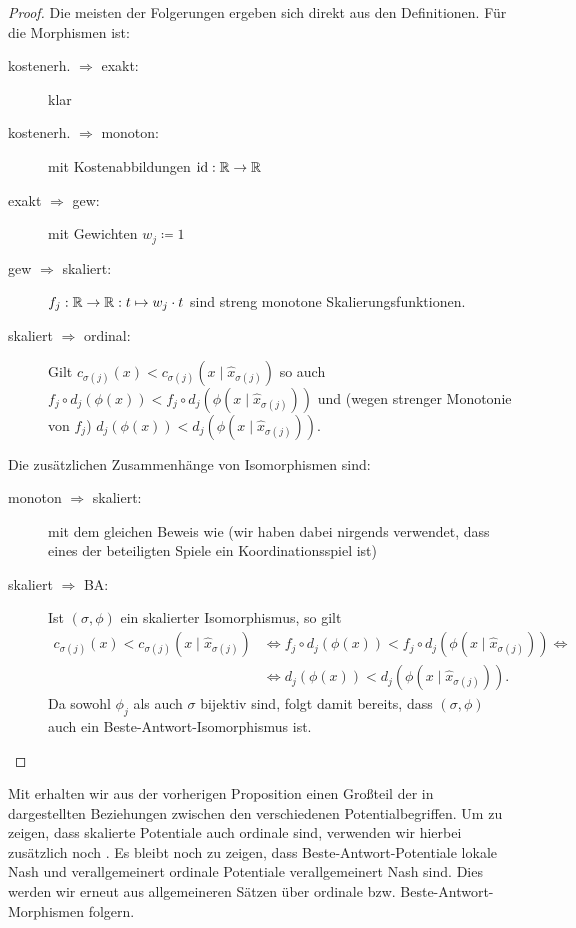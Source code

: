 \begin{proof}
	Die meisten der Folgerungen ergeben sich direkt aus den Definitionen. Für die Morphismen ist:
	\begin{description}
		\item[kostenerh. $\bm{\Rightarrow}$ exakt:] klar
		\item[kostenerh. $\bm{\Rightarrow}$ monoton:] mit Kostenabbildungen $\mathrm{id}: \mathbb{R} \to \mathbb{R}$
		\item[exakt $\bm{\Rightarrow}$ gew:] mit Gewichten $w_j \coloneqq 1$
		\item[gew $\bm{\Rightarrow}$ skaliert:] $f_j: \mathbb{R} \to \mathbb{R}: t \mapsto w_j \cdot t$ sind streng monotone Skalierungsfunktionen.
		\item[skaliert $\bm{\Rightarrow}$ ordinal:] Gilt $c_{\sigma(j)}(x) < c_{\sigma(j)}(x \mid \hat{x}_{\sigma(j)})$ so auch $f_j \circ d_j(\phi(x)) < f_j \circ d_j(\phi(x \mid \hat{x}_{\sigma(j)}))$ und (wegen strenger Monotonie von $f_j$) $d_j(\phi(x)) < d_j(\phi(x \mid \hat{x}_{\sigma(j)}))$.
	\end{description}
	Die zusätzlichen Zusammenhänge von Isomorphismen sind:
	\begin{description}
		\item[monoton $\bm{\Rightarrow}$ skaliert:] mit dem gleichen Beweis wie  (wir haben dabei nirgends verwendet, dass eines der beteiligten Spiele ein Koordinationsspiel ist)
		\item[skaliert $\bm{\Rightarrow}$ BA:] Ist $(\sigma, \phi)$ ein skalierter Isomorphismus, so gilt 
			\begin{align*}
				c_{\sigma(j)}(x) < c_{\sigma(j)}(x \mid \hat{x}_{\sigma(j)}) &\iff f_j \circ d_j(\phi(x)) < f_j \circ d_j(\phi(x \mid \hat{x}_{\sigma(j)})) \iff \\
																			 &\iff d_j(\phi(x)) < d_j(\phi(x \mid \hat{x}_{\sigma(j)})).
			\end{align*}
		Da sowohl $\phi_j$ als auch $\sigma$ bijektiv sind, folgt damit bereits, dass $(\sigma, \phi)$ auch ein Beste-Antwort-Isomorphismus ist. \qedhere
	\end{description}	
\end{proof}

Mit  erhalten wir aus der vorherigen Proposition einen Großteil der in  dargestellten Beziehungen zwischen den verschiedenen Potentialbegriffen. Um zu zeigen, dass skalierte Potentiale auch ordinale sind, verwenden wir hierbei zusätzlich noch . Es bleibt noch zu zeigen, dass Beste-Antwort-Potentiale lokale Nash und verallgemeinert ordinale Potentiale verallgemeinert Nash sind. Dies werden wir erneut aus allgemeineren Sätzen über ordinale bzw. Beste-Antwort-Morphismen folgern.

